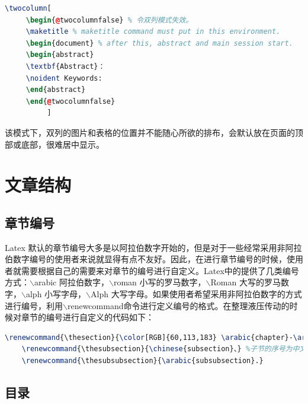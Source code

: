\documentclass[12pt]{book}
\begin{document}
\begin{lstlisting}[language=tex,breaklines]
     \twocolumn[
     \begin{@twocolumnfalse} % 令双列模式失效。
     \maketitle % maketitle command must put in this environment.
     \begin{document} % after this, abstract and main session start.
     \begin{abstract}
     \textbf{Abstract}：
     \noident Keywords:
     \end{abstract}
     \end{@twocolumnfalse}
          ]     
\end{lstlisting}

该模式下，双列的图片和表格的位置并不能随心所欲的排布，会默认放在页面的顶部或底部，很难居中显示。

\section{文章结构}

\subsection{章节编号}

Latex 默认的章节编号大多是以阿拉伯数字开始的，但是对于一些经常采用非阿拉伯数字编号的使用者来说就显得有点不友好。因此，在进行章节编号的时候，使用者就需要根据自己的需要来对章节的编号进行自定义。Latex中的提供了几类编号方式：$\backslash$arabic 阿拉伯数字，$\backslash$roman 小写的罗马数字，$\backslash$Roman 大写的罗马数字，$\backslash$alph 小写字母，$\backslash$Alph 大写字母。如果使用者希望采用非阿拉伯数字的方式进行编号，利用$\backslash$renewcommand命令进行定义编号的格式。在整理液压传动的时候对章节的编号进行自定义的代码如下：

\begin{lstlisting}[language=tex,breaklines]
	\renewcommand{\thesection}{\color[RGB]{60,113,183} \arabic{chapter}-\arabic{section}} %设置section的格式为章序号-节序号
	\renewcommand{\thesubsection}{\chinese{subsection}、} %子节的序号为中文序号+顿号
	\renewcommand{\thesubsubsection}{\arabic{subsubsection}.} 
\end{lstlisting}

\subsection{目录}
\end{document}
